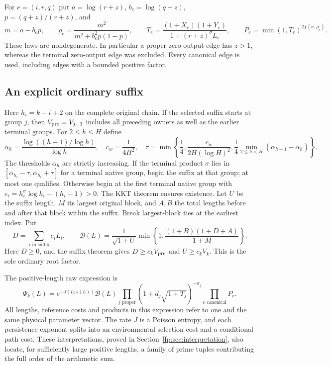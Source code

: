For $e=(i,r,q)$ put $a=\log(r+z)$, $b_e=\log(q+z)$,
$p=(q+z)/(r+z)$, and
\begin{equation}
 m=a-b_ep,\qquad
 \rho_e=\frac{m^2}{m^2+b_e^2p(1-p)},\qquad
 T_e=\frac{(1+X_e)(1+Y_e)}{1+(r+z)^\sigma L_i},\qquad
 P_e=\min(1,T_e)^{2\chi(\sigma,\rho_e)}.
 \label{profile:edge-factor}
\end{equation}
These laws are nondegenerate. In particular a proper zero-output edge
has $z>1$, whereas the terminal zero-output edge was excluded. Every
canonical edge is used, including edges with a bounded positive factor.

\subsection{An explicit ordinary suffix}
Here $h_i=k-i+2$ on the complete original chain. If the selected suffix
starts at group $j$, then $V_{\rm pre}=V_{j-1}$ includes all preceding
owners as well as the earlier terminal groups.
For $2\leq h\leq H$ define
\[
 \alpha_h=\frac{\log((h-1)/\log h)}{\log h},\quad
 c_w=\frac1{4H^2},\quad
 \tau=\min\left\{\frac14,\frac{c_w}{2H(\log H)^2},
 \frac14\min_{2\leq h<H}(\alpha_{h+1}-\alpha_h)\right\}.
\]
The thresholds $\alpha_h$ are strictly increasing. If the terminal
product $\sigma$ lies in $[\alpha_{h_i}-\tau,\alpha_{h_i}+\tau]$ for
a terminal native group, begin the suffix at that group; at most one
qualifies. Otherwise begin at the first terminal native group with
$e_i=h_i^\sigma\log h_i-(h_i-1)>0$. The KKT theorem ensures existence.
Let $U$ be the suffix length, $M$ its largest original block, and $A,B$
the total lengths before and after that block within the suffix. Break
largest-block ties at the earliest index. Put
\begin{equation}
 D=\sum_{i\text{ in suffix}}e_iL_i,\qquad
 \mathcal B(L)=\frac1{\sqrt{1+U}}
       \min\left\{1,\frac{(1+B)(1+D+A)}{1+M}\right\}.
 \label{profile:ordinary}
\end{equation}
Here $D\geq0$, and the suffix theorem gives $D\geq c_kV_{\rm pre}$
and $U\geq c_kV_k$. This is the sole ordinary root factor.

The positive-length raw expression is
\begin{equation}
 \Psi_k(L)=e^{-J(L;s(L))}\mathcal B(L)
 \prod_{j\text{ proper}}(1+d_j\sqrt{1+T_j})^{-\sigma_j}
 \prod_{e\text{ canonical}}P_e.
 \label{profile:raw}
\end{equation}
All lengths, reference costs and products in this expression refer to
one and the same physical parameter vector. The rate $J$ is a Poisson
entropy, and each persistence exponent splits into an environmental
selection cost and a conditional path cost. These interpretations,
proved in Section~\ref{fp:sec:interpretation}, also locate, for sufficiently
large positive lengths, a family of prime tuples contributing the full
order of the arithmetic sum.


